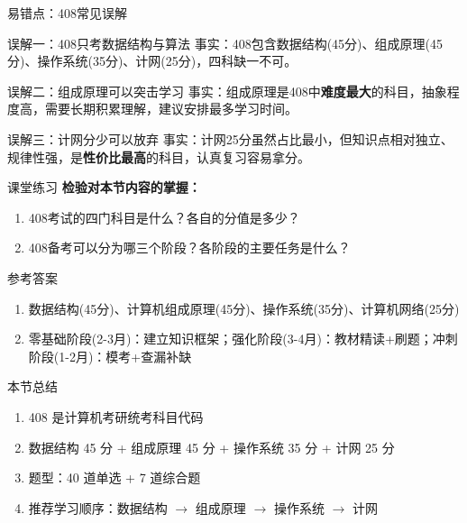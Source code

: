 \documentclass[10pt, aspectratio=169]{beamer}
\begin{document}
\begin{frame}{易错点：408常见误解}
    \begin{alertblock}{误解一：408只考数据结构与算法}
        事实：408包含数据结构(45分)、组成原理(45分)、操作系统(35分)、计网(25分)，四科缺一不可。
    \end{alertblock}
    \vspace{0.3em}
    \begin{alertblock}{误解二：组成原理可以突击学习}
        事实：组成原理是408中\textbf{难度最大}的科目，抽象程度高，需要长期积累理解，建议安排最多学习时间。
    \end{alertblock}
    \vspace{0.3em}
    \begin{alertblock}{误解三：计网分少可以放弃}
        事实：计网25分虽然占比最小，但知识点相对独立、规律性强，是\textbf{性价比最高}的科目，认真复习容易拿分。
    \end{alertblock}
\end{frame}

\begin{frame}{课堂练习}
    \textbf{检验对本节内容的掌握：}
    \vspace{0.5em}
    \begin{enumerate}
        \item 408考试的四门科目是什么？各自的分值是多少？
        \item 408备考可以分为哪三个阶段？各阶段的主要任务是什么？
    \end{enumerate}
    \vspace{0.5em}
    \begin{block}{参考答案}
        \begin{enumerate}
            \item 数据结构(45分)、计算机组成原理(45分)、操作系统(35分)、计算机网络(25分)
            \item 零基础阶段(2-3月)：建立知识框架；强化阶段(3-4月)：教材精读+刷题；冲刺阶段(1-2月)：模考+查漏补缺
        \end{enumerate}
    \end{block}
\end{frame}

\begin{frame}{本节总结}
    \begin{enumerate}
        \item 408 是计算机考研统考科目代码
        \item 数据结构 45 分 + 组成原理 45 分 + 操作系统 35 分 + 计网 25 分
        \item 题型：40 道单选 + 7 道综合题
        \item 推荐学习顺序：数据结构 $\to$ 组成原理 $\to$ 操作系统 $\to$ 计网
    \end{enumerate}
\end{frame}
\end{document}
